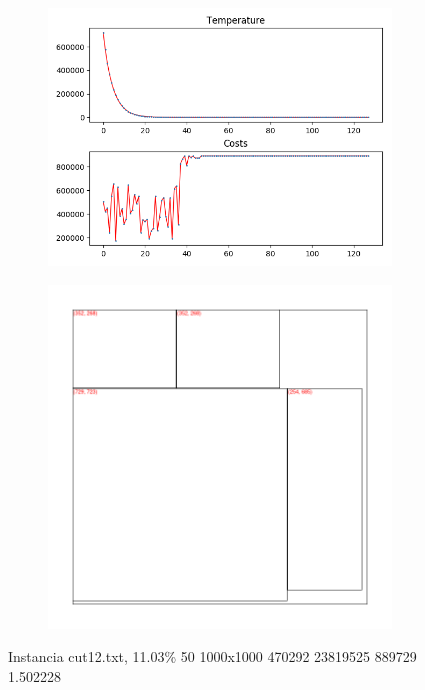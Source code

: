 
\begin{figure}
\centering
\begin{subfigure}{.5\textwidth}
  \centering
  \includegraphics[width=1\linewidth]{results/cut12/3/plot}
  \label{fig:sub1}
\end{subfigure}%
\begin{subfigure}{.5\textwidth}
  \centering
  \includegraphics[width=1\linewidth]{results/cut12/3/cut}
  \label{fig:sub2}
\end{subfigure}
\caption{Instancia cut12.txt, 11.03\% 50 1000x1000 470292 23819525 889729 1.502228}
\label{fig:test}
\end{figure}


